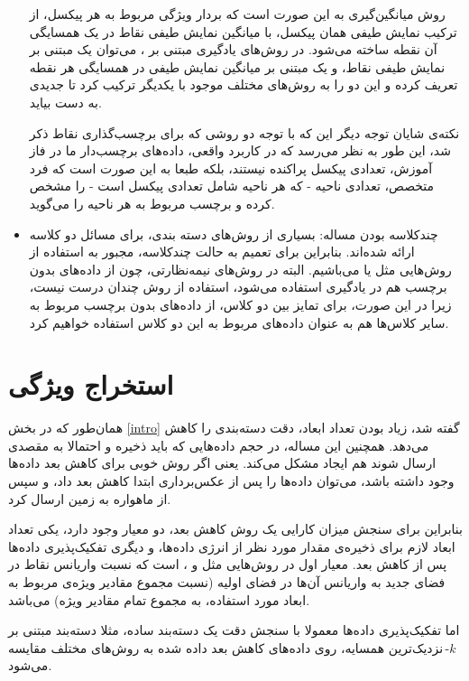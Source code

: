 \documentclass[11pt]{article}
\begin{document}
\begin{itemize}
روش میانگین‌گیری به این صورت است که بردار ویژگی مربوط به هر پیکسل، از ترکیب نمایش طیفی همان پیکسل، با میانگین نمایش طیفی نقاط در یک همسایگی آن نقطه ساخته می‌شود. در روش‌های یادگیری مبتنی بر ، می‌توان یک  مبتنی بر نمایش طیفی نقاط، و یک  مبتنی بر میانگین نمایش طیفی در همسایگی هر نقطه تعریف کرده و این دو  را به روش‌های مختلف موجود با یکدیگر ترکیب کرد تا  جدیدی به دست بیاید.

نکته‌ی شایان توجه دیگر این که با توجه دو روشی که برای برچسب‌گذاری نقاط ذکر شد، این طور به نظر می‌رسد که در کاربرد واقعی، داده‌های برچسب‌دار ما در فاز آموزش، تعدادی پیکسل پراکنده نیستند، بلکه طبعا به این صورت است که فرد متخصص، تعدادی ناحیه - که هر ناحیه شامل تعدادی پیکسل است - را مشخص کرده و برچسب مربوط به هر ناحیه را می‌گوید.
\item {چندکلاسه بودن مساله:}
بسیاری از روش‌های دسته بندی، برای مسائل دو کلاسه ارائه شده‌اند. بنابراین برای تعمیم به حالت چندکلاسه، مجبور به استفاده از روش‌هایی مثل \oAo{} یا \oAa{}  می‌باشیم. البته در روش‌های نیمه‌نظارتی، چون از داده‌های بدون برچسب هم در یادگیری استفاده می‌شود، استفاده از روش \oAo{} چندان درست نیست، زیرا در این صورت، برای تمایز بین دو کلاس، از داده‌های بدون برچسب مربوط به سایر کلاس‌ها هم به عنوان داده‌های مربوط به این دو کلاس استفاده خواهیم کرد.
\end{itemize}

\section {استخراج ویژگی}
همان‌طور که در بخش \ref{intro} گفته شد، زیاد بودن تعداد ابعاد، دقت دسته‌بندی را کاهش می‌دهد. همچنین این مساله، در حجم داده‌هایی که باید ذخیره و احتمالا به مقصدی ارسال شوند هم ایجاد مشکل می‌کند. یعنی اگر روش خوبی برای کاهش بعد داده‌ها وجود داشته باشد، ‌می‌توان داده‌ها را پس از عکس‌برداری ابتدا کاهش بعد داد، و سپس از ماهواره به زمین ارسال کرد.

بنابراین برای سنجش میزان کارایی یک روش کاهش بعد، دو معیار وجود دارد، یکی تعداد ابعاد لازم برای ذخیره‌ی مقدار مورد نظر از انرژی داده‌ها، و دیگری تفکیک‌پذیری داده‌ها پس از کاهش بعد. معیار اول در روش‌هایی مثل \PCA{} و \isomap{}، \residualvar{}  است که نسبت واریانس نقاط در فضای جدید به واریانس آن‌ها در فضای اولیه (نسبت مجموع مقادیر ویژه‌ی مربوط به ابعاد مورد استفاده، به مجموع تمام مقادیر ویژه) می‌باشد.

اما تفکیک‌پذیری داده‌ها معمولا با سنجش دقت یک دسته‌بند ساده، مثلا دسته‌بند مبتنی بر $k$-\,نزدیک‌ترین همسایه، روی داده‌های کاهش بعد داده شده به روش‌های مختلف مقایسه می‌شود.
\end{document}
